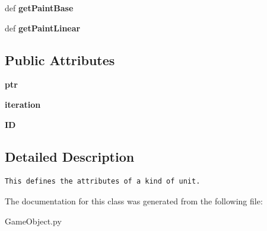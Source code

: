 \begin{CompactItemize}
\item 
\hypertarget{classGameObject_1_1UnitType_c41e7e7e52dc8727adbc516d80436961}{
def \textbf{getPaintBase}}
\label{classGameObject_1_1UnitType_c41e7e7e52dc8727adbc516d80436961}

\item 
\hypertarget{classGameObject_1_1UnitType_79a963c9e82fa8b2adea377e5d2db743}{
def \textbf{getPaintLinear}}
\label{classGameObject_1_1UnitType_79a963c9e82fa8b2adea377e5d2db743}

\end{CompactItemize}
\subsection*{Public Attributes}
\begin{CompactItemize}
\item 
\hypertarget{classGameObject_1_1UnitType_02c8aeecd19a6f22db3bcbf76ae57b42}{
\textbf{ptr}}
\label{classGameObject_1_1UnitType_02c8aeecd19a6f22db3bcbf76ae57b42}

\item 
\hypertarget{classGameObject_1_1UnitType_b40da5ccdb5930c478ac8a20ff6309ee}{
\textbf{iteration}}
\label{classGameObject_1_1UnitType_b40da5ccdb5930c478ac8a20ff6309ee}

\item 
\hypertarget{classGameObject_1_1UnitType_8dc3cbd5a4de477054d7357678e37ef8}{
\textbf{ID}}
\label{classGameObject_1_1UnitType_8dc3cbd5a4de477054d7357678e37ef8}

\end{CompactItemize}


\subsection{Detailed Description}


\footnotesize\begin{verbatim}This defines the attributes of a kind of unit.
\end{verbatim}
\normalsize
 

The documentation for this class was generated from the following file:\begin{CompactItemize}
\item 
GameObject.py\end{CompactItemize}

